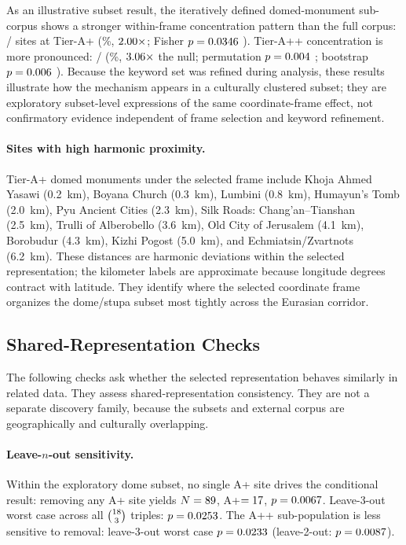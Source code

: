 \documentclass[12pt,a4paper]{article}
\begin{document}
As an illustrative subset result, the iteratively defined domed-monument
sub-corpus shows a stronger within-frame concentration pattern than the full
corpus: \NcircTierAp/\NcircTotal{} sites at Tier-A+
(\NcircApRate\%, $2.00\times$; Fisher $p = 0.0346$
\pCircApFisherSig{}).
Tier-A++ concentration is more pronounced: \NcircTierApp/\NcircTotal{}
(\NcircAppRate\%, $3.06\times$ the \NullRateApp{} null;
permutation $p = 0.004$ \pCircAppPermSig{};
bootstrap $p = 0.006$ \pCircAppBootSig{}). Because the keyword set
was refined during analysis, these results illustrate how the mechanism
appears in a culturally clustered subset; they are exploratory subset-level
expressions of the same coordinate-frame effect, not confirmatory evidence
independent of frame selection and keyword refinement.

\paragraph{Sites with high harmonic proximity.}
Tier-A+ domed monuments under the selected frame include Khoja Ahmed Yasawi
(0.2~km), Boyana Church (0.3~km), Lumbini (0.8~km), Humayun's Tomb (2.0~km),
Pyu Ancient Cities (2.3~km), Silk Roads: Chang'an--Tianshan (2.5~km),
Trulli of Alberobello (3.6~km), Old City of Jerusalem (4.1~km),
Borobudur (4.3~km), Kizhi Pogost (5.0~km), and Echmiatsin/Zvartnots (6.2~km).
These distances are harmonic deviations within the selected representation;
the kilometer labels are approximate because longitude degrees contract with
latitude.
They identify where the selected coordinate frame organizes the dome/stupa
subset most tightly across the Eurasian corridor.

\subsection{Shared-Representation Checks}
\label{sec:results_stability}

The following checks ask whether the selected representation behaves similarly
in related data. They assess shared-representation consistency. They are not
a separate discovery family, because the subsets and external corpus are
geographically and culturally overlapping.

\paragraph{Leave-$n$-out sensitivity.}
Within the exploratory dome subset, no single A+ site drives the conditional
result: removing any A+ site yields
$N = 89$, A+$= 17$, $p = 0.0067$.
Leave-3-out worst case across all $\binom{18}{3}$ triples:
$p = 0.0253$. The A++ sub-population is less sensitive to removal:
leave-3-out worst case $p = 0.0233$ (leave-2-out: $p = 0.0087$).
\end{document}
